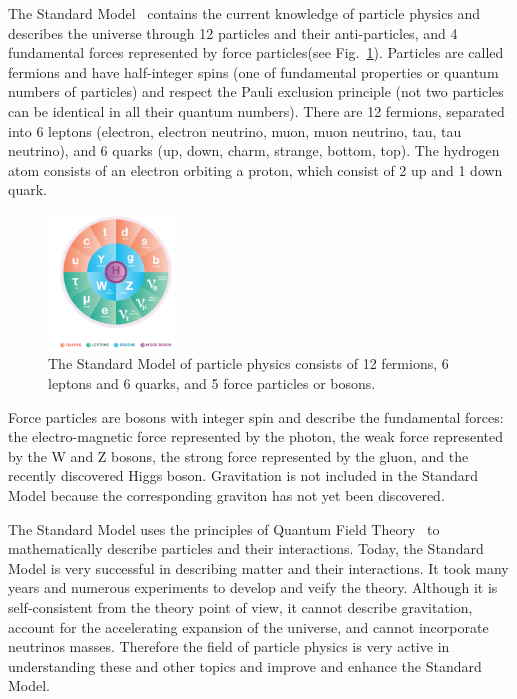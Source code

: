 \documentclass{wscpaperproc}
\theoremstyle{wsc}
\begin{document}
The Standard Model~ contains the current knowledge of particle physics and describes the universe through 12 particles and their anti-particles, and 4 fundamental forces represented by force particles(see Fig.~\ref{fig:sm}). Particles are called fermions and have half-integer spins (one of fundamental properties or quantum numbers of particles) and respect the Pauli exclusion principle (not two particles can be identical in all their quantum numbers). There are 12 fermions, separated into 6 leptons (electron, electron neutrino, muon, muon neutrino, tau, tau neutrino), and 6 quarks (up, down, charm, strange, bottom, top). The hydrogen atom consists of an electron orbiting a proton, which consist of 2 up and 1 down quark.

\begin{figure}[htb]
{
   \centering
   \includegraphics[width=0.30\textwidth]{StandardModel}
   \caption{The Standard Model of particle physics consists of 12 fermions, 6 leptons and 6 quarks, and 5 force particles or bosons.
   \label{fig:sm}}
}
\end{figure}

Force particles are bosons with integer spin and describe the fundamental forces: the electro-magnetic force represented by the photon, the weak force represented by the W and Z bosons, the strong force represented by the gluon, and the recently discovered Higgs boson. Gravitation is not included in the Standard Model because the corresponding graviton has not yet been discovered.

The Standard Model uses the principles of Quantum Field Theory~ to mathematically describe particles and their interactions. Today, the Standard Model is very successful in describing matter and their interactions. It took many years and numerous experiments to develop and veify the theory. Although it is self-consistent from the theory point of view, it cannot describe gravitation, account for the accelerating expansion of the universe, and cannot incorporate neutrinos masses. Therefore the field of particle physics is very active in understanding these and other topics and improve and enhance the Standard Model.
\end{document}
